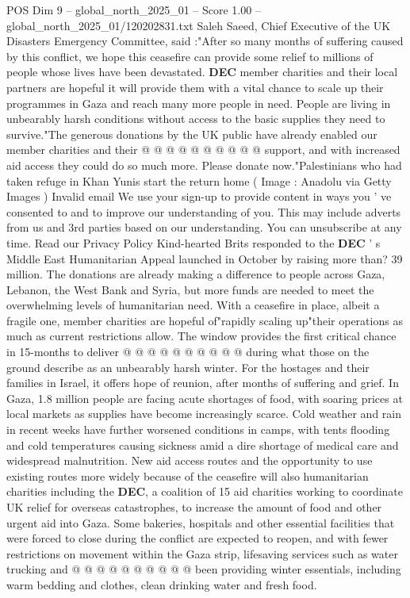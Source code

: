 \begin{textsample}{POS Dim 9 – global\_north\_2025\_01 – Score 1.00 – global\_north\_2025\_01/120202831.txt}
Saleh Saeed, Chief Executive of the UK Disasters Emergency Committee, said :"After so many months of suffering caused by this conflict, we hope this ceasefire can provide some relief to millions of people whose lives have been devastated. \textbf{DEC} member charities and their local partners are hopeful it will provide them with a vital chance to scale up their programmes in Gaza and reach many more people in need.
People are living in unbearably harsh conditions without access to the basic supplies they need to survive."The generous donations by the UK public have already enabled our member charities and their @ @ @ @ @ @ @ @ @ @ support, and with increased aid access they could do so much more.
Please donate now."Palestinians who had taken refuge in Khan Yunis start the return home ( Image : Anadolu via Getty Images ) Invalid email We use your sign-up to provide content in ways you ' ve consented to and to improve our understanding of you.
This may include adverts from us and 3rd parties based on our understanding.
You can unsubscribe at any time.
Read our Privacy Policy Kind-hearted Brits responded to the \textbf{DEC} ' s Middle East Humanitarian Appeal launched in October by raising more than? 39 million.
The donations are already making a difference to people across Gaza, Lebanon, the West Bank and Syria, but more funds are needed to meet the overwhelming levels of humanitarian need.
With a ceasefire in place, albeit a fragile one, member charities are hopeful of"rapidly scaling up"their operations as much as current restrictions allow.
The window provides the first critical chance in 15-months to deliver @ @ @ @ @ @ @ @ @ @ during what those on the ground describe as an unbearably harsh winter.
For the hostages and their families in Israel, it offers hope of reunion, after months of suffering and grief.
In Gaza, 1.8 million people are facing acute shortages of food, with soaring prices at local markets as supplies have become increasingly scarce.
Cold weather and rain in recent weeks have further worsened conditions in camps, with tents flooding and cold temperatures causing sickness amid a dire shortage of medical care and widespread malnutrition.
New aid access routes and the opportunity to use existing routes more widely because of the ceasefire will also humanitarian charities including the \textbf{DEC}, a coalition of 15 aid charities working to coordinate UK relief for overseas catastrophes, to increase the amount of food and other urgent aid into Gaza.
Some bakeries, hospitals and other essential facilities that were forced to close during the conflict are expected to reopen, and with fewer restrictions on movement within the Gaza strip, lifesaving services such as water trucking and @ @ @ @ @ @ @ @ @ @ been providing winter essentials, including warm bedding and clothes, clean drinking water and fresh food.

\end{textsample}
